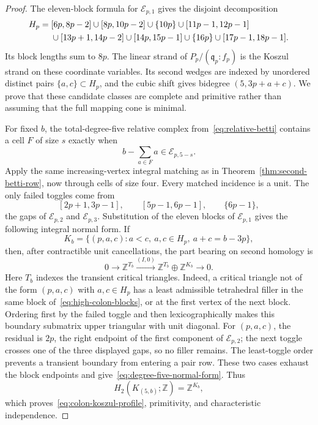 \documentclass[11pt]{article}
\theoremstyle{definition}
\theoremstyle{remark}
\begin{document}
\begin{proof}
The eleven-block formula for \(\mathcal E_{p,1}\) gives the disjoint decomposition
\begin{align}
H_p={}&[6p,8p-2]\cup[8p,10p-2]\cup\{10p\}\cup[11p-1,12p-1]\notag\\
&\cup[13p+1,14p-2]\cup[14p,15p-1]\cup\{16p\}\cup[17p-1,18p-1].
\label{eq:high-colon-blocks}
\end{align}
Its block lengths sum to \(8p\). The linear strand of
\(P_p/(\mathfrak q_p:f_p)\) is the Koszul strand on these coordinate variables. Its second
wedges are indexed by unordered distinct pairs \(\{a,c\}\subset H_p\), and the cubic shift gives
bidegree \((5,3p+a+c)\). We prove that these candidate classes are complete and primitive rather
than assuming that the full mapping cone is minimal.

For fixed \(b\), the total-degree-five relative complex from~\eqref{eq:relative-betti} contains a
cell \(F\) of size \(s\) exactly when
\[
b-\sum_{a\in F}a\in\mathcal E_{p,5-s}.
\]
Apply the same increasing-vertex integral matching as in
Theorem~\ref{thm:second-betti-row}, now through cells of size four. Every matched incidence is a
unit. The only failed toggles come from
\[
[2p+1,3p-1],\qquad[5p-1,6p-1],\qquad\{6p-1\},
\]
the gaps of \(\mathcal E_{p,2}\) and \(\mathcal E_{p,3}\). Substitution of the eleven blocks of
\(\mathcal E_{p,1}\) gives the following integral normal form. If
\[
K_b=\{(p,a,c):a<c,\ a,c\in H_p,\ a+c=b-3p\},
\]
then, after contractible unit cancellations, the part bearing on second homology is
\begin{equation}
0\longrightarrow\mathbb Z^{T_b}
\xrightarrow{(I,0)}\mathbb Z^{T_b}\oplus\mathbb Z^{K_b}
\longrightarrow0.
\label{eq:degree-five-normal-form}
\end{equation}
Here \(T_b\) indexes the transient critical triangles. Indeed, a critical triangle not of the
form \((p,a,c)\) with \(a,c\in H_p\) has a least admissible tetrahedral filler in the same block
of~\eqref{eq:high-colon-blocks}, or at the first vertex of the next block. Ordering first by the
failed toggle and then lexicographically makes this boundary submatrix upper triangular with unit
diagonal. For \((p,a,c)\), the residual is \(2p\), the right endpoint of the first component of
\(\mathcal E_{p,2}\); the next toggle crosses one of the three displayed gaps, so no filler
remains. The least-toggle order prevents a transient boundary from entering a pair row. These two
cases exhaust the block endpoints and give~\eqref{eq:degree-five-normal-form}. Thus
\[
H_2(K_{(5,b)};\mathbb Z)=\mathbb Z^{K_b},
\]
which proves~\eqref{eq:colon-koszul-profile}, primitivity, and characteristic independence.


\end{proof}
\end{document}
